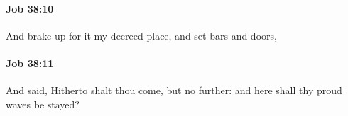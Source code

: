 		\paragraph{Job 38:10} %
			\label{JOB-38-10}

			And brake up for it my decreed place, and set bars and doors,


		\paragraph{Job 38:11} %
			\label{JOB-38-11}

			And said, Hitherto shalt thou come, but no further: and here shall thy proud waves be stayed?


